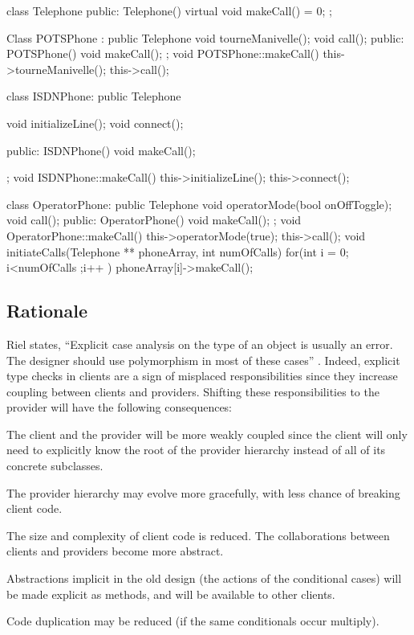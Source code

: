 \documentclass[a4paper,10pt,twoside]{book}
\begin{document}
\begin{code}
class Telephone {
public:
	Telephone() {}
	virtual void makeCall() = 0;
};

Class POTSPhone : public Telephone {
	void tourneManivelle();
	void call();
public: 
	POTSPhone() {}
	void makeCall();
};
void POTSPhone::makeCall() {
	this->tourneManivelle();
	this->call();
}

class ISDNPhone: public Telephone {
	void initializeLine();
	void connect();

public:
	ISDNPhone() { }
	void makeCall();
};
void ISDNPhone::makeCall() {
	this->initializeLine();
	this->connect();
}

class OperatorPhone: public Telephone {
	void operatorMode(bool onOffToggle);
	void call();
public: 
	OperatorPhone() { }
	void makeCall();
};
void OperatorPhone::makeCall() {
	this->operatorMode(true);
	this->call();
}
void initiateCalls(Telephone ** phoneArray, int numOfCalls) {
	for(int i = 0; i<numOfCalls ;i++ ) {
		phoneArray[i]->makeCall();
	}
}
\end{code}

\subsection*{Rationale}

Riel states, ``Explicit case analysis on the type of an object is usually an error. The designer should use polymorphism in most of these cases'' \cite{Riel96a}. Indeed, explicit type checks in clients are a sign of misplaced responsibilities since they increase coupling between clients and providers. Shifting these responsibilities to the provider will have the following consequences:

\begin{bulletlist}
\item The client and the provider will be more weakly coupled since the client will only need to explicitly know the root of the provider hierarchy instead of all of its concrete subclasses.

\item The provider hierarchy may evolve more gracefully, with less chance of breaking client code.

\item The size and complexity of client code is reduced. The collaborations between clients and providers become more abstract.

\item Abstractions implicit in the old design (\ie the actions of the conditional cases) will be made explicit as methods, and will be available to other clients.

\item Code duplication may be reduced (if the same conditionals occur multiply).
\end{bulletlist}
\end{document}
